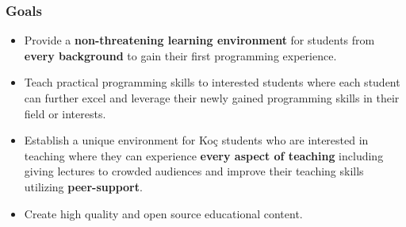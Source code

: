     \begin{frame}
      \frametitle{Goals}
      \Large
      \pause
      \begin{itemize}
        \item Provide a \textbf{non-threatening learning environment} for students from \textbf{every background} to gain their first programming experience.
        \pause
        \item Teach practical programming skills to interested students where each student can further excel and leverage their newly gained programming skills in their field or interests.
        \pause
        \item Establish a unique environment for Koç students who are interested in teaching where they can experience \textbf{every aspect of teaching} including giving lectures to crowded audiences and improve their teaching skills utilizing \textbf{peer-support}.
        \pause
        \item Create high quality and open source educational content.
      \end{itemize}
      
    \end{frame}


